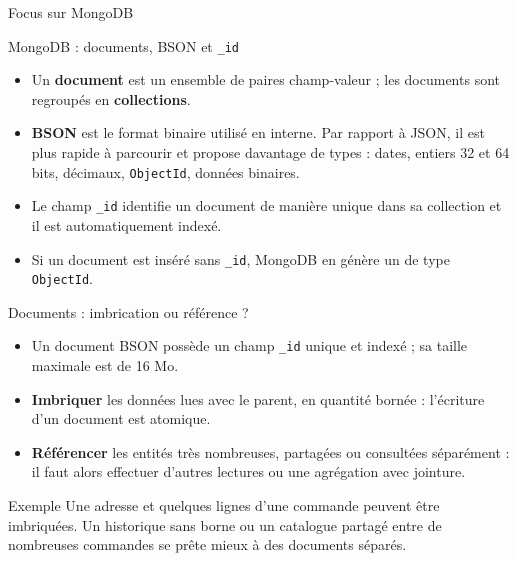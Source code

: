 \begin{frame}[standout]

    Focus sur MongoDB


\end{frame}

\begin{frame}{MongoDB : documents, BSON et \texttt{\_id}}
    \begin{itemize}
        \item Un \textbf{document} est un ensemble de paires champ-valeur ; les
              documents sont regroupés en \textbf{collections}.
        \item \textbf{BSON} est le format binaire utilisé en interne. Par
              rapport à JSON, il est plus rapide à parcourir et propose
              davantage de types : dates, entiers 32 et 64 bits, décimaux,
              \texttt{ObjectId}, données binaires.
        \item Le champ \texttt{\_id} identifie un document de manière unique
              dans sa collection et il est automatiquement indexé.
        \item Si un document est inséré sans \texttt{\_id}, MongoDB en génère un
              de type \texttt{ObjectId}.
    \end{itemize}
\end{frame}

\begin{frame}[fragile]{Documents : imbrication ou référence ?}
    \begin{itemize}
        \item Un document BSON possède un champ \texttt{\_id} unique et indexé ;
              sa taille maximale est de 16 Mo.
        \item \textbf{Imbriquer} les données lues avec le parent, en quantité
              bornée : l'écriture d'un document est atomique.
        \item \textbf{Référencer} les entités très nombreuses, partagées ou
              consultées séparément : il faut alors effectuer d'autres lectures
              ou une agrégation avec jointure.
    \end{itemize}

    \begin{examplebox}{Exemple}
        Une adresse et quelques lignes d'une commande peuvent être imbriquées.
        Un historique sans borne ou un catalogue partagé entre de nombreuses
        commandes se prête mieux à des documents séparés.
    \end{examplebox}

\end{frame}

